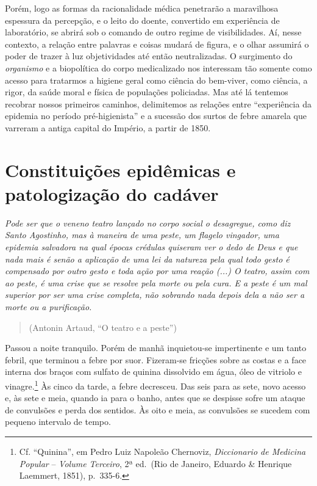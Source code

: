 Porém, logo as formas da racionalidade médica penetrarão a maravilhosa
espessura da percepção, e o leito do doente, convertido em experiência
de laboratório, se abrirá sob o comando de outro regime de
visibilidades. Aí, nesse contexto, a relação entre palavras e coisas
mudará de figura, e o olhar assumirá o poder de trazer à luz
objetividades até então neutralizadas. O surgimento do \emph{organismo}
e a biopolítica do corpo medicalizado nos interessam tão somente como
acesso para tratarmos a higiene geral como ciência do bem-viver, como
ciência, a rigor, da saúde moral e física de populações policiadas. Mas
até lá tentemos recobrar nossos primeiros caminhos, delimitemos as
relações entre ``experiência da epidemia no período pré-higienista'' e a
sucessão dos surtos de febre amarela que varreram a antiga capital do
Império, a partir de 1850.

\hypertarget{constituiuxe7uxf5es-epiduxeamicas-e-patologizauxe7uxe3o-do-caduxe1ver}{%
\section{Constituições epidêmicas e patologização do
cadáver}\label{constituiuxe7uxf5es-epiduxeamicas-e-patologizauxe7uxe3o-do-caduxe1ver}}

\emph{Pode ser que o veneno teatro lançado no corpo social o desagregue,
como diz Santo Agostinho, mas à maneira de uma peste, um flagelo
vingador, uma epidemia salvadora na qual épocas crédulas quiseram ver o
dedo de Deus e que nada mais é senão a aplicação de uma lei da natureza
pela qual todo gesto é compensado por outro gesto e toda ação por uma
reação (...) O teatro, assim com ao peste, é uma crise que se resolve
pela morte ou pela cura. E a peste é um mal superior por ser uma crise
completa, não sobrando nada depois dela a não ser a morte ou a
purificação.}

\begin{quote}
(Antonin Artaud, ``O teatro e a peste'')
\end{quote}

Passou a noite tranquilo. Porém de manhã inquietou-se impertinente e um
tanto febril, que terminou a febre por suor. Fizeram-se fricções sobre
as costas e a face interna dos braços com sulfato de quinina dissolvido
em água, óleo de vitriolo e vinagre.\footnote{Cf. ``Quinina'', em Pedro
  Luiz Napoleão Chernoviz, \emph{Diccionario de Medicina Popular} --
  \emph{Volume Terceiro}, 2ª ed.~(Rio de Janeiro, Eduardo \& Henrique
  Laemmert, 1851), p.~335-6.} Às cinco da tarde, a febre decresceu. Das
seis para as sete, novo acesso e, às sete e meia, quando ia para o
banho, antes que se despisse sofre um ataque de convulsões e perda dos
sentidos. Às oito e meia, as convulsões se sucedem com pequeno intervalo
de tempo.

